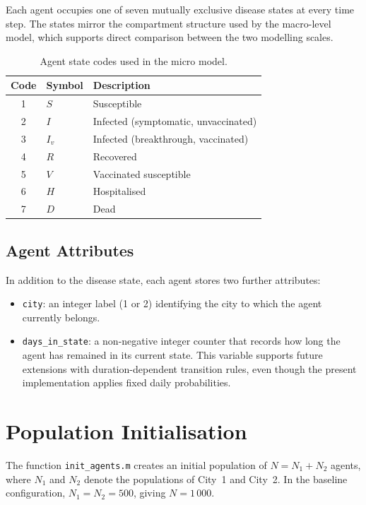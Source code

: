 Each agent occupies one of seven mutually exclusive disease states at every time step.
The states mirror the compartment structure used by the macro-level model, which supports direct comparison between the two modelling scales.

\begin{table}[ht]
\centering
\caption{Agent state codes used in the micro model.}
\label{tab:states}
\begin{tabular}{@{}cll@{}}
\toprule
\textbf{Code} & \textbf{Symbol} & \textbf{Description} \\
\midrule
1 & $S$   & Susceptible \\
2 & $I$   & Infected (symptomatic, unvaccinated) \\
3 & $I_v$ & Infected (breakthrough, vaccinated) \\
4 & $R$   & Recovered \\
5 & $V$   & Vaccinated susceptible \\
6 & $H$   & Hospitalised \\
7 & $D$   & Dead \\
\bottomrule
\end{tabular}
\end{table}

\subsection{Agent Attributes}
\label{sec:attributes}

In addition to the disease state, each agent stores two further attributes:
\begin{itemize}
  \item \texttt{city}: an integer label (1 or 2) identifying the city to which the agent currently belongs.
  \item \texttt{days\_in\_state}: a non-negative integer counter that records how long the agent has remained in its current state.
    This variable supports future extensions with duration-dependent transition rules, even though the present implementation applies fixed daily probabilities.
\end{itemize}

\section{Population Initialisation}
\label{sec:init}

The function \texttt{init\_agents.m} creates an initial population of $N = N_1 + N_2$ agents, where $N_1$ and $N_2$ denote the populations of City~1 and City~2.
In the baseline configuration, $N_1 = N_2 = 500$, giving $N = 1\,000$.

